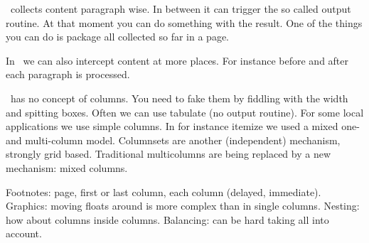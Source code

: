 
\startdocument
  [title=The scripts,
   color=darkyellow]

\StartSteps

\startsubject[title=Output]

    \startitemize[packed]

        \startitem \TEX\ collects content paragraph wise. \stopitem \FlushStep
        \startitem In between it can trigger the so called output routine. \stopitem \FlushStep
        \startitem At that moment you can do something with the result. \stopitem \FlushStep
        \startitem One of the things you can do is package all collected so far in a page. \stopitem \FlushStep

    \stopitemize

\stopsubject

\startsubject[title=Bonus]

    \startitemize[packed]

        \startitem In \LUATEX\ we can also intercept content at more places. \stopitem \FlushStep
        \startitem For instance before and after each paragraph is processed. \stopitem \FlushStep

    \stopitemize

\stopsubject

\StopSteps \page \StartSteps

\startsubject[title=Columns]

    \startitemize[packed]

        \startitem \TEX\ has no concept of columns. \stopitem \FlushStep
        \startitem You need to fake them by fiddling with the width and spitting boxes. \stopitem \FlushStep
        \startitem Often we can use tabulate (no output routine). \stopitem \FlushStep
        \startitem For some local applications we use simple columns. \stopitem \FlushStep
        \startitem In for instance itemize we used a mixed one- and multi-column model. \stopitem \FlushStep
        \startitem Columnsets are another (independent) mechanism, strongly grid based. \stopitem \FlushStep
        \startitem Traditional multicolumns are being replaced by a new mechanism: mixed columns. \stopitem \FlushStep

    \stopitemize

\stopsubject

\startsubject[title=Pitfalls]

    \startitemize[packed]

        \startitem Footnotes: page, first or last column, each column (delayed, immediate). \stopitem \FlushStep
        \startitem Graphics: moving floats around is more complex than in single columns. \stopitem \FlushStep
        \startitem Nesting: how about columns inside columns. \stopitem \FlushStep
        \startitem Balancing: can be hard taking all into account. \stopitem \FlushStep

